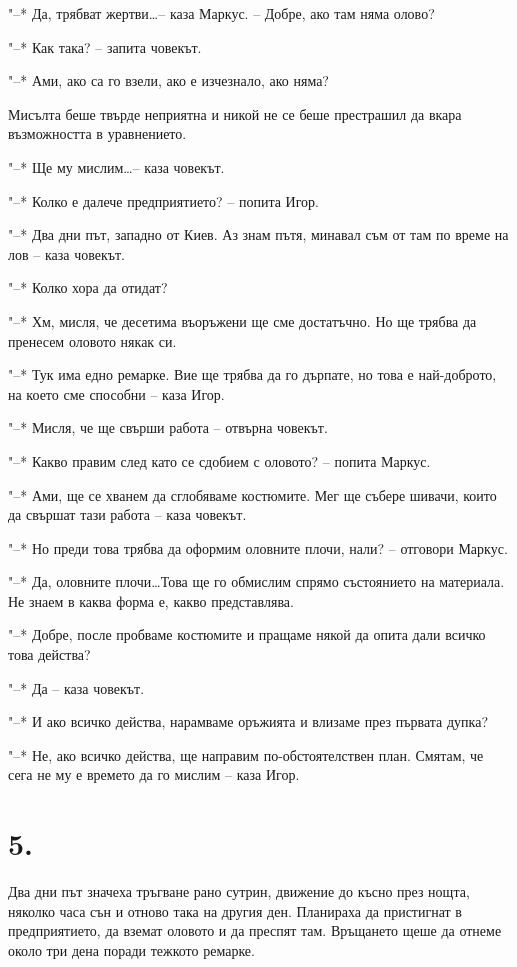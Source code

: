 \documentclass[ebook,openany,12pt]{memoir}
\begin{document}
"--* Да, трябват жертви\ldots -- каза Маркус. – Добре, ако там няма олово?

"--* Как така? – запита човекът.

"--* Ами, ако са го взели, ако е изчезнало, ако няма?

Мисълта беше твърде неприятна и никой не се беше престрашил да вкара възможността в уравнението.

"--* Ще му мислим\ldots -- каза човекът.

"--* Колко е далече предприятието? – попита Игор.

"--* Два дни път, западно от Киев. Аз знам пътя, минавал съм от там по време на лов – каза човекът.

"--* Колко хора да отидат?

"--* Хм, мисля, че десетима въоръжени ще сме достатъчно. Но ще трябва да пренесем оловото някак си.

"--* Тук има едно ремарке. Вие ще трябва да го дърпате, но това е най-доброто, на което сме способни – каза Игор.

"--* Мисля, че ще свърши работа – отвърна човекът.

"--* Какво правим след като се сдобием с оловото? – попита Маркус.

"--* Ами, ще се хванем да сглобяваме костюмите. Мег ще събере шивачи, които да свършат тази работа – каза човекът.

"--* Но преди това трябва да оформим оловните плочи, нали? – отговори Маркус.

"--* Да, оловните плочи\ldots Това ще го обмислим спрямо състоянието на материала. Не знаем в каква форма е, какво представлява.

"--* Добре, после пробваме костюмите и пращаме някой да опита дали всичко това действа?

"--* Да – каза човекът.

"--* И ако всичко действа, нарамваме оръжията и влизаме през първата дупка?

"--* Не, ако всичко действа, ще направим по-обстояте\-лствен план. Смятам, че сега не му е времето да го мислим – каза Игор.

\section*{5.}

Два дни път значеха тръгване рано сутрин, движение до късно през нощта, няколко часа сън и отново така на другия ден. Планираха да пристигнат в предприятието, да вземат оловото и да преспят там. Връщането щеше да отнеме около три дена поради тежкото ремарке.
\end{document}
